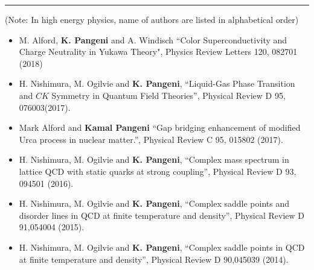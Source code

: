 \documentclass[10pt,letterpaper]{article}
\begin{document}
\hrule
\vspace{1ex}
(Note: In high energy physics, name of authors are listed in alphabetical order)\\

\begin{itemize}
\item  M. Alford, \textbf{K. Pangeni} and A. Windisch ``Color Superconductivity and Charge Neutrality in Yukawa Theory", Physics Review Letters 120, 082701 (2018)
 \item H. Nishimura, M. Ogilvie and \textbf{K. Pangeni}, ``Liquid-Gas Phase Transition and $CK$ Symmetry in Quantum Field Theories'', Physical Review D 95, 076003(2017).
\item  Mark Alford and \textbf{Kamal Pangeni} ``Gap bridging enhancement of modified Urca process in nuclear matter.'', Physical Review C 95, 015802 (2017).
 \item H. Nishimura, M. Ogilvie and \textbf{K. Pangeni}, ``Complex mass spectrum in lattice QCD with static quarks at strong coupling'', Physical Review D 93, 094501 (2016).
 \item  H. Nishimura, M. Ogilvie and \textbf{K. Pangeni}, ``Complex saddle points and disorder lines in QCD at finite temperature and density'', Physical Review D 91,054004 (2015). 
 \item H. Nishimura, M. Ogilvie and \textbf{K. Pangeni}, ``Complex saddle points in QCD at finite temperature and density'', Physical Review D 90,045039 (2014). 
 \end{itemize}
\end{document}
